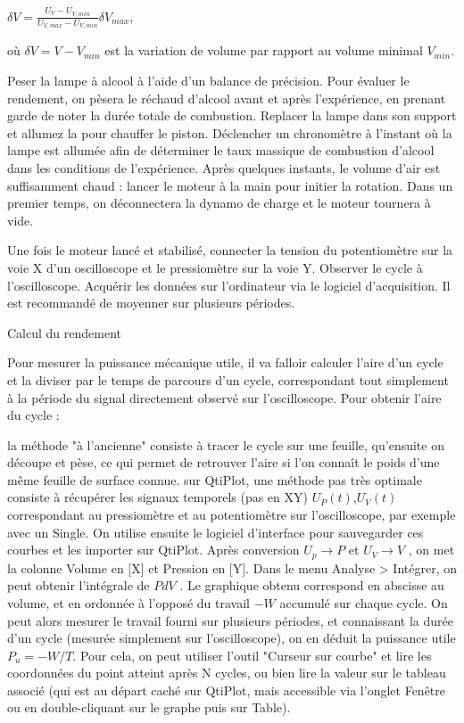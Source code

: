 \documentclass{article}%
\begin{document}
$\delta V=\frac{U_V-U_{V,min}}{U_{V,max}-U_{V,min}}\delta V_{max}$,

où $\delta V=V-V_{min}$ est la variation de volume par rapport au volume minimal $V_{min}$.

    Peser la lampe à alcool à l'aide d'un balance de précision. Pour évaluer le rendement, on pèsera le réchaud d'alcool avant et après l'expérience, en prenant garde de noter la durée totale de combustion.
    Replacer la lampe dans son support et allumez la pour chauffer le piston. Déclencher un chronomètre à l'instant où la lampe est allumée afin de déterminer le taux massique de combustion d'alcool dans les conditions de l'expérience.
    Après quelques instants, le volume d'air est suffisamment chaud : lancer le moteur à la main pour initier la rotation.
    Dans un premier temps, on déconnectera la dynamo de charge et le moteur tournera à vide.

Une fois le moteur lancé et stabilisé, connecter la tension du potentiomètre sur la voie X d'un oscilloscope et le pressiomètre sur la voie Y. Observer le cycle à l'oscilloscope. Acquérir les données sur l'ordinateur via le logiciel d'acquisition. Il est recommandé de moyenner sur plusieurs périodes.

Calcul du rendement

Pour mesurer la puissance mécanique utile, il va falloir calculer l'aire d'un cycle et la diviser par le temps de parcours d'un cycle, correspondant tout simplement à la période du signal directement observé sur l'oscilloscope. Pour obtenir l'aire du cycle :

    la méthode "à l'ancienne" consiste à tracer le cycle sur une feuille, qu'ensuite on découpe et pèse, ce qui permet de retrouver l'aire si l'on connaît le poids d'une même feuille de surface connue.
    sur QtiPlot, une méthode pas très optimale consiste à récupérer les signaux temporels (pas en XY) $U_P(t)$,$U_V(t)$ correspondant au pressiomètre et au potentiomètre sur l'oscilloscope, par exemple avec un Single. On utilise ensuite le logiciel d'interface pour sauvegarder ces courbes et les importer sur QtiPlot. Après conversion $U_p \to P$ et $U_V \to V$ , on met la colonne Volume en [X] et Pression en [Y]. Dans le menu Analyse > Intégrer, on peut obtenir l'intégrale de $P dV$ . Le graphique obtenu correspond en abscisse au volume, et en ordonnée à l'opposé du travail $- W$ accumulé sur chaque cycle. On peut alors mesurer le travail fourni sur plusieurs périodes, et connaissant la durée d'un cycle (mesurée simplement sur l'oscilloscope), on en déduit la puissance utile $P_u = -W/T$. Pour cela, on peut utiliser l'outil "Curseur sur courbe" et lire les coordonnées du point atteint après N cycles, ou bien lire la valeur sur le tableau associé (qui est au départ caché sur QtiPlot, mais accessible via l'onglet Fenêtre ou en double-cliquant sur le graphe puis sur Table).
\end{document}
